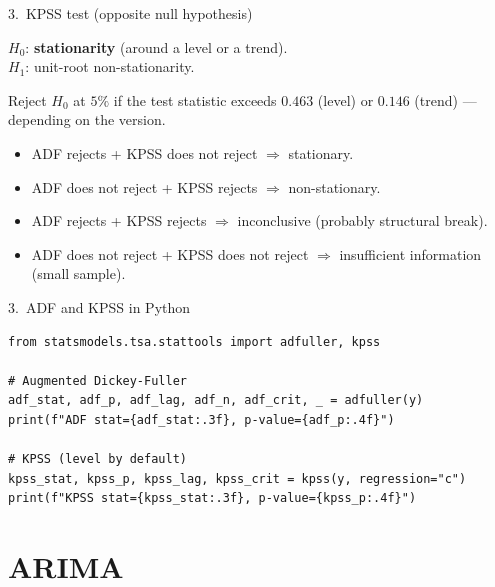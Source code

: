 \documentclass[aspectratio=169]{beamer}
\begin{document}
\begin{frame}{3.~KPSS test (opposite null hypothesis)}
  \begin{defbox}
    $H_0$: \textbf{stationarity} (around a level or a trend).\\
    $H_1$: unit-root non-stationarity.
  \end{defbox}
  \medskip
  Reject $H_0$ at $5\%$ if the test statistic exceeds $0.463$
  (level) or $0.146$ (trend) — depending on the version.
  \medskip
  \begin{infobox}
    \begin{itemize}
      \item ADF rejects + KPSS does not reject $\Rightarrow$ stationary.
      \item ADF does not reject + KPSS rejects $\Rightarrow$ non-stationary.
      \item ADF rejects + KPSS rejects $\Rightarrow$ inconclusive
            (probably structural break).
      \item ADF does not reject + KPSS does not reject $\Rightarrow$
            insufficient information (small sample).
    \end{itemize}
  \end{infobox}
\end{frame}

\begin{frame}[fragile]{3.~ADF and KPSS in Python}
\begin{lstlisting}
from statsmodels.tsa.stattools import adfuller, kpss

# Augmented Dickey-Fuller
adf_stat, adf_p, adf_lag, adf_n, adf_crit, _ = adfuller(y)
print(f"ADF stat={adf_stat:.3f}, p-value={adf_p:.4f}")

# KPSS (level by default)
kpss_stat, kpss_p, kpss_lag, kpss_crit = kpss(y, regression="c")
print(f"KPSS stat={kpss_stat:.3f}, p-value={kpss_p:.4f}")
\end{lstlisting}
\end{frame}

\section{ARIMA}
\end{document}
